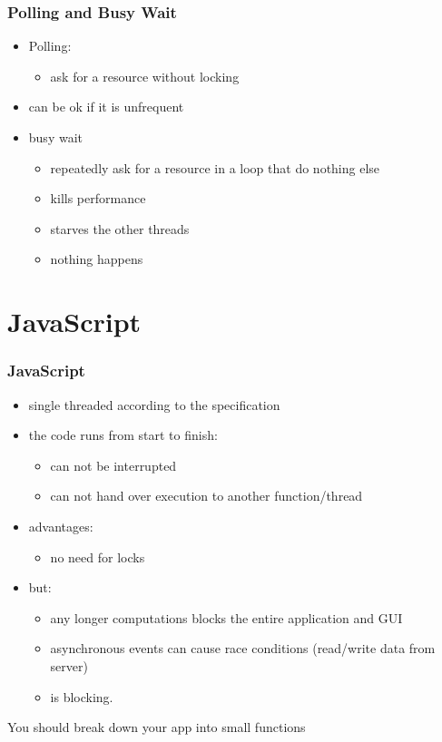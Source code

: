 \begin{frame}[fragile] \frametitle{Polling and Busy Wait}
\begin{itemize}
  \item Polling:
  \begin{itemize}
    \item ask for a resource without locking
  \end{itemize}
  \item can be ok if it is unfrequent
  \item busy wait
  \begin{itemize}
    \item repeatedly ask for a resource in a loop that do nothing else
    \item  kills performance
    \item starves the other threads
    \item nothing happens
  \end{itemize}
\end{itemize}
\end{frame}

\section{JavaScript}
\begin{frame}[fragile] \frametitle{JavaScript}
\begin{itemize}
  \item single threaded according to the specification
  \item the code runs from start to finish:
  \begin{itemize}
    \item can not be interrupted
    \item can not hand over execution to another function/thread
  \end{itemize}
  \item advantages:
  \begin{itemize}
    \item no need for locks
  \end{itemize}
  \item but:
  \begin{itemize}
    \item any longer computations blocks the entire application and GUI
    \item asynchronous events can cause race conditions (read/write data from server)
    \item {} is blocking.
  \end{itemize}
\end{itemize}
\vspace{5mm}
You should break down your app into small functions
\end{frame}


